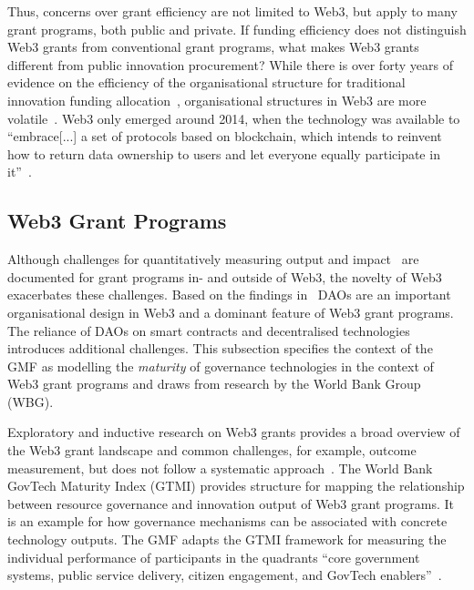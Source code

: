 \documentclass[conference]{IEEEtran}
\begin{document}
Thus, concerns over grant efficiency are not limited to Web3, but apply to many grant programs, both public and private. If funding efficiency does not distinguish Web3 grants from conventional grant programs, what makes Web3 grants different from public innovation procurement? While there is over forty years of evidence on the efficiency of the organisational structure for traditional innovation funding allocation~\cite[p.~4]{holmstrom_agency_1989}, organisational structures in Web3 are more volatile~\cite[p.~25]{zuo_development_2023}. Web3 only emerged around 2014, when the technology was available to ``embrace[...] a set of protocols based on blockchain, which intends to reinvent how to return data ownership to users and let everyone equally participate in it''~\cite[p.~4]{wan_web3_2023}.

\subsection{Web3 Grant Programs}\label{sec_2.1}

Although challenges for quantitatively measuring output and impact~\cite{ding_desci_2022,howell_financing_2017} are documented for grant programs in- and outside of Web3, the novelty of Web3 exacerbates these challenges. Based on the findings in~\cite{ding_desci_2022,wan_web3_2023} DAOs are an important organisational design in Web3 and a dominant feature of Web3 grant programs. The reliance of DAOs on smart contracts and decentralised technologies introduces additional challenges. This subsection specifies the context of the GMF as modelling the \textit{maturity} of governance technologies in the context of Web3 grant programs and draws from research by the World Bank Group (WBG).

Exploratory and inductive research on Web3 grants provides a broad overview of the Web3 grant landscape and common challenges, for example, outcome measurement, but does not follow a systematic approach~\cite{leventhal_state_2023_long,leventhal_state_2024}. The World Bank GovTech Maturity Index (GTMI) provides structure for mapping the relationship between resource governance and innovation output of Web3 grant programs. It is an example for how governance mechanisms can be associated with concrete technology outputs. The GMF adapts the GTMI framework for measuring the individual performance of participants in the quadrants ``core government systems, public service delivery, citizen engagement, and GovTech enablers''~\cite[p.~5]{dener_govtech_2021}.
\end{document}
